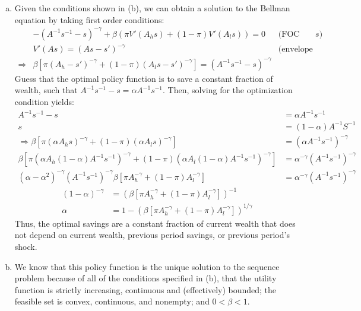 \documentclass{article}
\newcommand{\sneg}{s^{-1}}
\newcommand{\Aneg}{A^{-1}}
\renewcommand{\sneg}{s^{-1}}
\begin{document}
\begin{enumerate}[(a)]
	\item Given the conditions shown in (b), we can obtain a solution to the Bellman equation by taking first order conditions:
		\begin{align*}
		& -\left(A^{-1}s^{-1}-s\right)^{-\gamma} + \beta\left(\pi V'(A_hs) + (1-\pi)V'(A_ls)\right) = 0	&\text{(FOC w/r/t }s\text{)}	\\
		& V'(As) = \left(As-s'\right)^{-\gamma}		&\text{(envelope condition)}	\\
		\Rightarrow & \beta\left[\pi(A_h - s')^{-\gamma} + (1-\pi)(A_ls - s')^{-\gamma}\right] = \left(A^{-1}s^{-1}-s\right)^{-\gamma}
		\end{align*}
		Guess that the optimal policy function is to save a constant fraction of wealth, such that ${A^{-1}s^{-1}-s = \alpha A^{-1}s^{-1}}$. Then, solving for the optimization condition yields:
		\begin{align*}
			A^{-1}s^{-1}-s &= \alpha A^{-1}s^{-1}	\\
			s &= (1-\alpha)A^{-1}S^{-1}				\\
\Rightarrow \beta\left[\pi(\alpha A_hs)^{-\gamma} + (1-\pi)(\alpha A_ls)^{-\gamma}\right] &= (\alpha\Aneg\sneg)^{-\gamma}	\\
			\beta\left[\pi(\alpha A_h(1-\alpha)\Aneg\sneg)^{-\gamma} + (1-\pi)(\alpha A_l(1-\alpha)\Aneg\sneg)^{-\gamma}\right]  &= \alpha^{-\gamma}(\Aneg\sneg)^{-\gamma}	\\
			(\alpha - \alpha^2)^{-\gamma}(\Aneg\sneg)^{-\gamma}\beta\left[\pi A_h^{-\gamma} + (1-\pi)A_l^{-\gamma}\right] &= \alpha^{-\gamma}(\Aneg\sneg)^{-\gamma}	
		\end{align*}
		\begin{align*}
			(1-\alpha)^{-\gamma} &= \left(\beta\left[\pi A_h^{-\gamma} + (1-\pi)A_l^{-\gamma}\right]\right)^{-1}	\\
			\alpha &= 1 - \left(\beta\left[\pi A_h^{-\gamma} + (1-\pi)A_l^{-\gamma}\right]\right)^{1/\gamma}
		\end{align*}
		Thus, the optimal savings are a constant fraction of current wealth that does not depend on current wealth, previous period savings, or previous period's shock.
	
	\item We know that this policy function is the unique solution to the sequence problem because of all of the conditions specified in (b), that the utility function is strictly increasing, continuous and (effectively) bounded; the feasible set is convex, continuous, and nonempty; and $0<\beta<1$.
	
\end{enumerate}
\end{document}
